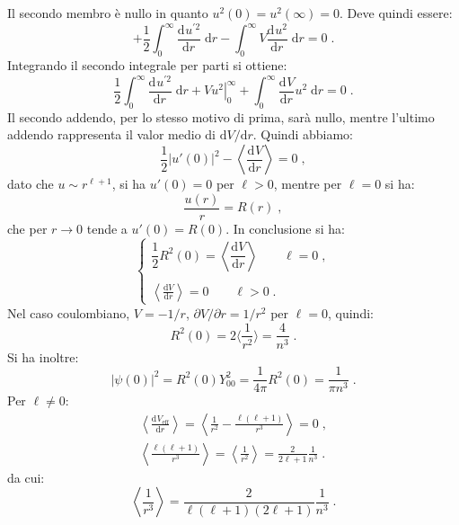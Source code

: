 \documentclass[12pt,a4paper]{report}
\theoremstyle{definition}
\newcommand{\dev}[3][]{\frac{\mathrm{d}^{#1} #2}{\mathrm{d} #3^{#1}}}
\numberwithin{equation}{section}
\newcommand{\diff}[1][]{\mathrm{d}#1}
\newcommand{\bra}{\langle}
\newcommand{\ket}{\rangle}
\begin{document}
Il secondo membro è nullo in quanto $u^2(0)=u^2(\infty)=0$. Deve quindi essere:
\begin{equation}
+\frac{1}{2}\int_0^{\infty} \dev{u^{'2}}{r}\;\diff{r}-\int_0^{\infty} V\dev{u^2}{r}\;\diff{r}=0\;.
\end{equation}
Integrando il secondo integrale per parti si ottiene:
\begin{equation}
\frac{1}{2}\int_0^{\infty} \dev{u^{'2}}{r}\;\diff{r}+\left. Vu^2\right|^{\infty}_0+\int_0^{\infty} \dev{V}{r}u^2\;\diff{r}=0\;.
\end{equation}
Il secondo addendo, per lo stesso motivo di prima, sarà nullo, mentre l'ultimo addendo rappresenta il valor medio di $\diff{V}/\diff{r}$. Quindi abbiamo:
\begin{equation}
\frac{1}{2}|u'(0)|^2-\left\langle\dev{V}{r}\right\rangle=0\;,
\end{equation}
dato che $u\sim r^{\ell+1}$, si ha $u'(0)=0$ per $\ell>0$, mentre per $\ell=0$ si ha:
\begin{equation}
\frac{u(r)}{r}=R(r)\;,
\end{equation}
che per $r\to 0$ tende a $u'(0)=R(0)$. In conclusione si ha:
\begin{equation}
\begin{cases}
\dfrac{1}{2}R^2(0)=\left\langle \dfrac{\diff{V}}{\diff{r}}\right\rangle \qquad \ell=0 \;,\\
\\
\left\langle\frac{\diff{V}}{\diff{r}}\right\rangle=0\qquad \ell>0\;.
\end{cases}
\end{equation}
Nel caso coulombiano, $V=-1/r$, $\partial V/\partial r=1/r^2$ per $\ell=0$, quindi:
\begin{equation}
R^2(0)=2\bra \frac{1}{r^2}\ket=\frac{4}{n^3}\;.
\end{equation}
Si ha inoltre:
\begin{equation}
|\psi(0)|^2=R^2(0)Y^2_{00}=\frac{1}{4\pi}R^2(0)=\frac{1}{\pi n^3}\;.
\end{equation}
Per $\ell\ne 0$:
\begin{align}
\left\langle \dev{V_{\mathrm{eff}}}{r}\right\rangle=\left\langle \frac{1}{r^2}-\frac{\ell(\ell+1)}{r^3}\right\rangle=0\;, \\
\left\langle \frac{\ell(\ell+1)}{r^3}\right\rangle=\left\langle \frac{1}{r^2}\right\rangle=\frac{2}{2\ell+1}\frac{1}{n^3}\;.
\end{align}
da cui:
\begin{equation}
\left\langle \frac{1}{r^3}\right\rangle= \frac{2}{\ell(\ell+1)(2\ell+1)}\frac{1}{n^3}\;.
\end{equation}
\end{document}
